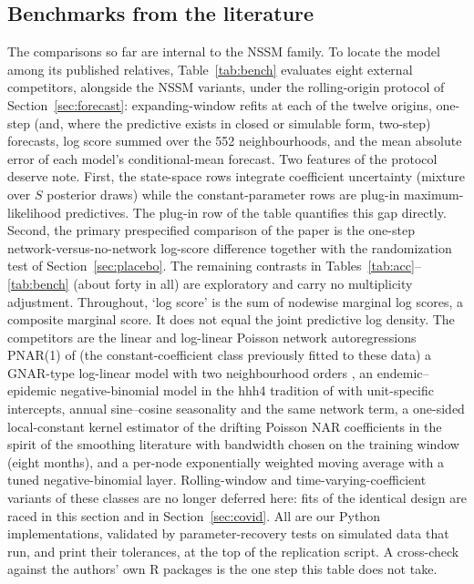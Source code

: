 \documentclass[12pt]{article}
\theoremstyle{plain}
\theoremstyle{definition}
\theoremstyle{remark}
\newcommand{\NumRegions}{552}
\begin{document}
\subsection{Benchmarks from the literature}\label{sec:bench}
The comparisons so far are internal to the NSSM family. To locate the model among its published relatives, Table~\ref{tab:bench} evaluates eight external competitors, alongside the NSSM variants, under the rolling-origin protocol of Section~\ref{sec:forecast}: expanding-window refits at each of the twelve origins, one-step (and, where the predictive exists in closed or simulable form, two-step) forecasts, log score summed over the \NumRegions{} neighbourhoods, and the mean absolute error of each model's conditional-mean forecast. Two features of the protocol deserve note. First, the state-space rows integrate coefficient uncertainty (mixture over $S$ posterior draws) while the constant-parameter rows are plug-in maximum-likelihood predictives. The plug-in row of the table quantifies this gap directly. Second, the primary prespecified comparison of the paper is the one-step network-versus-no-network log-score difference together with the randomization test of Section~\ref{sec:placebo}. The remaining contrasts in Tables~\ref{tab:acc}--\ref{tab:bench} (about forty in all) are exploratory and carry no multiplicity adjustment. Throughout, `log score' is the sum of nodewise marginal log scores, a composite marginal score. It does not equal the joint predictive log density. The competitors are the linear and log-linear Poisson network autoregressions PNAR(1) of \citet{armillotta2024count} (the constant-coefficient class previously fitted to these data) a GNAR-type log-linear model with two neighbourhood orders \citep{knight2020gnar}, an endemic--epidemic negative-binomial model in the hhh4 tradition of \citet{held2005statistical} with unit-specific intercepts, annual sine--cosine seasonality and the same network term, a one-sided local-constant kernel estimator of the drifting Poisson NAR coefficients in the spirit of the smoothing literature \citep{li2026grouped,ding2025tvnar} with bandwidth chosen on the training window (eight months), and a per-node exponentially weighted moving average with a tuned negative-binomial layer. Rolling-window and time-varying-coefficient variants of these classes are no longer deferred here: fits of the identical design are raced in this section and in Section~\ref{sec:covid}. All are our Python implementations, validated by parameter-recovery tests on simulated data that run, and print their tolerances, at the top of the replication script. A cross-check against the authors' own R packages is the one step this table does not take.
\end{document}
